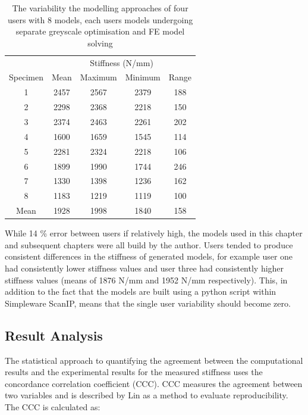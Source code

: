 \begin{table}[h]
    \centering
    \label{tab:user_var}
    \caption{The variability the modelling approaches of four users with 8
        models, each users models undergoing separate greyscale optimisation
    and FE model solving}
\begin{tabular}{c|c|c|c|c}
         & \multicolumn{4}{c}{Stiffness (N/mm)} \\ 
Specimen & Mean  & Maximum  & Minimum  & Range  \\ \hline
1        & 2457  & 2567     & 2379     & 188    \\
2        & 2298  & 2368     & 2218     & 150    \\
3        & 2374  & 2463     & 2261     & 202    \\
4        & 1600  & 1659     & 1545     & 114    \\
5        & 2281  & 2324     & 2218     & 106    \\
6        & 1899  & 1990     & 1744     & 246    \\
7        & 1330  & 1398     & 1236     & 162    \\
8        & 1183  & 1219     & 1119     & 100    \\ \hline
Mean     & 1928  & 1998   & 1840     & 158 \\ \hline
\end{tabular}
\end{table}

While 14 \% error between users if relatively high, the models used in this
chapter and subsequent chapters were all build by the author. Users tended to
produce consistent differences in the stiffness of generated models, for
example user one had consistently lower stiffness values and user three had
consistently higher stiffness values (means of 1876 N/mm and 1952 N/mm
respectively). This, in addition to the fact that the models are built using a
python script within Simpleware ScanIP, means that the single user variability
should become zero.

\subsection{Result Analysis}

The statistical approach to quantifying the agreement between the computational
results and the experimental results for the measured stiffness uses the
concordance correlation coefficient (CCC).  CCC measures the agreement between
two variables and is described by Lin \cite{lawrence1989concordance} as a
method to evaluate reproducibility.  The CCC is calculated as:

